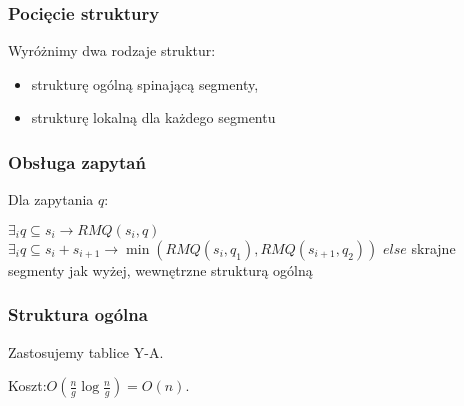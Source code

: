 \documentclass{beamer}
\begin{document}
\begin{frame} \frametitle{Pocięcie struktury}
 Wyróżnimy dwa rodzaje struktur:
 \begin{itemize}
  \item strukturę ogólną spinającą segmenty,
  \item strukturę lokalną dla każdego segmentu
 \end{itemize}
\end{frame}

\begin{frame} \frametitle{Obsługa zapytań}
 Dla zapytania $q$:
 
 $\exists_i q \subseteq s_i \rightarrow RMQ(s_i, q)$\linebreak
 $\exists_i q \subseteq s_i + s_{i+1} \rightarrow \min (RMQ(s_i, q_1), RMQ(s_{i+1}, q_2))$\linebreak
 $else$ skrajne segmenty jak wyżej, wewnętrzne strukturą ogólną
\end{frame}

\begin{frame} \frametitle{Struktura ogólna}
 Zastosujemy tablice Y-A.
 
 Koszt:$O(\frac{n}{g} \log \frac{n}{g}) = O(n)$.
\end{frame}
\end{document}
